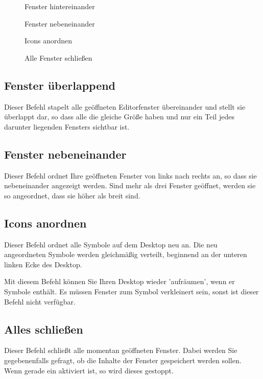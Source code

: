 \begin{description}
\item[] Fenster hintereinander
\item[] Fenster nebeneinander
\item[] Icons anordnen
\item[] Alle Fenster schließen
\end{description}

\subsection{Fenster überlappend}
\label{sec:MI_CASCADE}

Dieser Befehl stapelt alle geöffneten Editorfenster übereinander 
und stellt sie überlappt dar, so dass alle die gleiche Größe 
haben und nur ein Teil jedes darunter liegenden Fensters sichtbar 
ist.

\subsection{Fenster nebeneinander}\label{sec:MI_TILE}

Dieser Befehl ordnet Ihre geöffneten Fenster von links nach 
rechts an, so dass sie nebeneinander angezeigt werden. Sind 
mehr als drei Fenster geöffnet, werden sie so angeordnet, dass 
sie höher als breit sind.

\subsection{Icons anordnen}\label{sec:MI_ARRANGEICONS}

Dieser Befehl ordnet alle Symbole auf dem Desktop neu an. Die 
neu angeordneten Symbole werden gleichmäßig verteilt, beginnend 
an der unteren linken Ecke des Desktop.


Mit diesem Befehl können Sie Ihren Desktop wieder 'aufräumen', 
wenn er Symbole enthält. Es müssen Fenster zum Symbol verkleinert 
sein, sonst ist dieser Befehl nicht verfügbar.


\subsection{Alles schließen}
\label{sec:MI_CLOSEALL}


Dieser Befehl schließt alle momentan geöffneten Fenster. 
Dabei werden Sie gegebenenfalls gefragt, ob die Inhalte der Fenster 
gespeichert werden sollen. Wenn gerade ein  
aktiviert ist, so wird dieses gestoppt.
\fi

